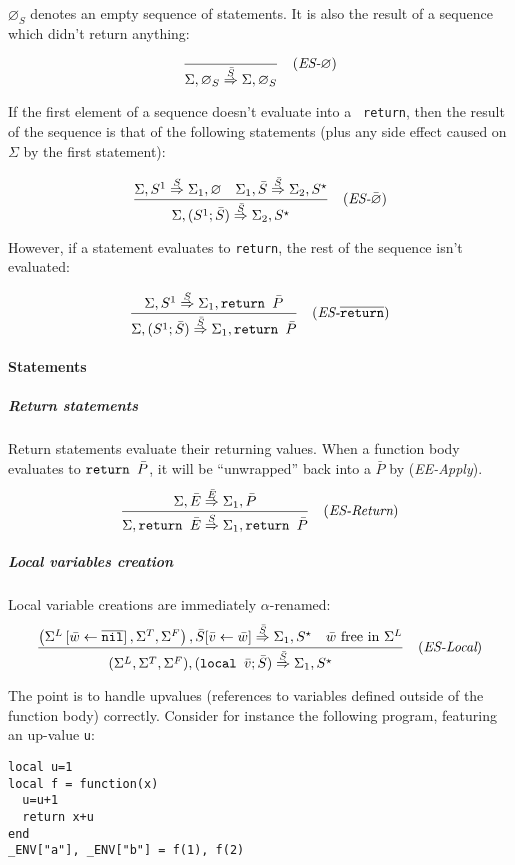 $\varnothing_S$ denotes an empty sequence of statements. It is also the
result of a sequence which didn't return anything:

$$\frac{
}{
\Sigma, \varnothing_S \stackrel{\bar S}{\Rightarrow} \Sigma, \varnothing_S
}
\quad(\textit{ES-}\varnothing)$$

\noindent
If the first element of a sequence doesn't evaluate into a {\tt
  return}, then the result of the sequence is that of the following
statements (plus any side effect caused on $\Sigma$ by the first
statement):

$$\frac{
\Sigma, S^1 \stackrel{S}{\Rightarrow} \Sigma_1, \varnothing
\quad
\Sigma_1, \bar S \stackrel{\bar S}{\Rightarrow} \Sigma_2, S^\star
}{
\Sigma, (S^1;\bar S) \stackrel{\bar S}{\Rightarrow} \Sigma_2, S^\star
}
\quad(\textit{ES-$\bar\varnothing$})$$

\noindent
However, if a statement evaluates to {\tt return},
the rest of the sequence isn't evaluated:

$$\frac{
\Sigma, S^1 \stackrel{S}{\Rightarrow} \Sigma_1, \texttt{return\ }\bar P
}{
\Sigma, (S^1;\bar S) \stackrel{\bar S}{\Rightarrow} \Sigma_1, \texttt{return\ }\bar P
}
\quad(\textit{ES-}\overline{\tt return})$$

\paragraph{Statements}

\subparagraph{Return statements}
Return statements evaluate their returning values. When a function
body evaluates to $\texttt{return\ }\bar P$, it will be ``unwrapped'' back
into a $\bar P$ by ({\it EE-Apply}).
%
$$\frac{
\Sigma, \bar E \stackrel{\bar E}{\Rightarrow} \Sigma_1, \bar P
}{
\Sigma, \texttt{return\ }\bar E \stackrel{S}{\Rightarrow} \Sigma_1, \texttt{return\ }\bar P
}
\quad(\textit{ES-Return})$$

\subparagraph{Local variables creation}
Local variable creations are immediately $\alpha$-renamed:
%
$$\frac{
\left(\Sigma^L\left[\bar w \leftarrow\overline{\texttt{nil}}\right],\Sigma^T,\Sigma^F\right), 
\bar S[\bar v \leftarrow \bar w]
\stackrel{\bar S}{\Rightarrow} \Sigma_1, S^\star
\quad
\bar w \textrm{\ free in }\Sigma^L
}{
(\Sigma^L,\Sigma^T,\Sigma^F), (\texttt{local\ }\bar v; \bar S)
\stackrel{\bar S}{\Rightarrow} \Sigma_1, S^\star
}\quad(\textit{ES-Local})$$

\noindent
The point is to handle upvalues (references to variables defined
outside of the function body) correctly. Consider for instance the
following program, featuring an up-value {\tt u}:
\begin{verbatim}
local u=1
local f = function(x)
  u=u+1
  return x+u
end
_ENV["a"], _ENV["b"] = f(1), f(2)
\end{verbatim}

